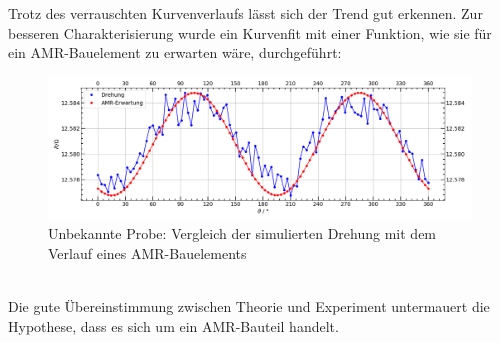 \documentclass[german,  %
parskip=full,  %
]{scrartcl}
\begin{document}
Trotz des verrauschten Kurvenverlaufs lässt sich der Trend gut erkennen. Zur besseren Charakterisierung wurde ein Kurvenfit mit einer Funktion, wie sie für ein AMR-Bauelement zu erwarten wäre, durchgeführt: \\
\begin{figure}[h!]\centering
\includegraphics[width=\textwidth]{Probe3_Drehung_vs_AMR_Erwartung.png}
\caption{Unbekannte Probe: Vergleich der simulierten Drehung mit dem Verlauf eines AMR-Bauelements}
\end{figure} \\
Die gute Übereinstimmung zwischen Theorie und Experiment untermauert die Hypothese, dass es sich um ein AMR-Bauteil handelt.
%
\end{document}
